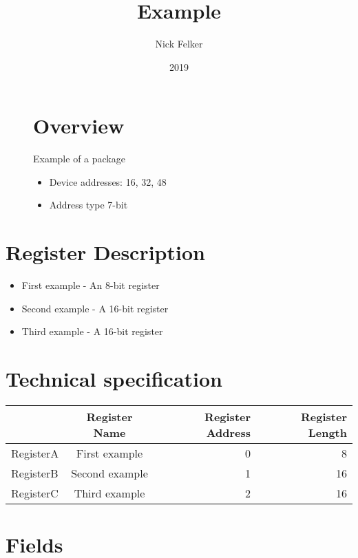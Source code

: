 \documentclass[a4paper,12pt,oneside,pdflatex,italian,final,twocolumn]{article}
\title{ Example }
\author{ Nick Felker }
\date{ 2019 }
\begin{document}
\pagestyle{fancy}



\onecolumn


\begin{figure}
\begin{minipage}{0.47\textwidth}

\section{Overview}
    Example of a package
    \begin{itemize}
        \item Device addresses:
          16,
          32,
          48
        \item Address type 7-bit
    \end{itemize}


\end{minipage}
\hfill

\end{figure}


\section{Register Description}
\begin{itemize}
\item First example - An 8-bit register
\item Second example - A 16-bit register
\item Third example - A 16-bit register
\end{itemize}

\section{Technical specification}
\centering
\begin{tabular}{lcrr}
\toprule
 & Register Name & Register Address & Register Length \\
\midrule
RegisterA & First example & 0 & 8 \\
RegisterB & Second example & 1 & 16 \\
RegisterC & Third example & 2 & 16 \\
\bottomrule
\end{tabular}

\raggedright

\section{Fields}
\end{document}
